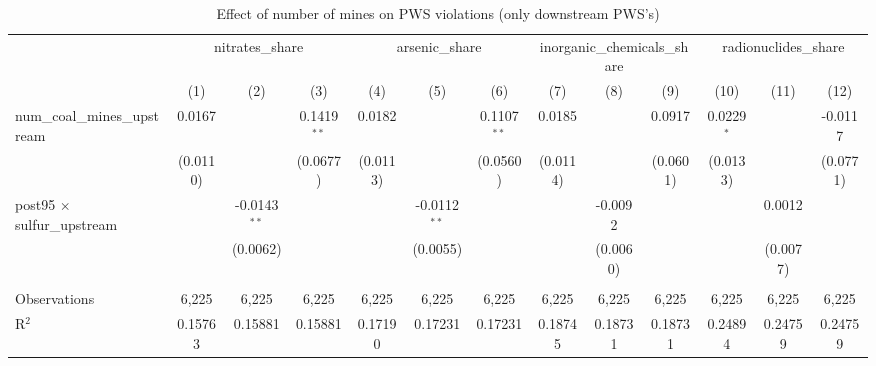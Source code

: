 
\begin{table}[htbp]
   \caption{\label{olsrf2sls_nummine_mine_vio_1985to2005dwnstrm} Effect of number of mines on PWS violations (only downstream PWS's)}
   \bigskip
   \centering
   \begin{adjustbox}{width = \textwidth, center}
      \begin{tabular}{lcccccccccccc}
         \toprule
          & \multicolumn{3}{c}{nitrates\_share} & \multicolumn{3}{c}{arsenic\_share} & \multicolumn{3}{c}{inorganic\_chemicals\_share} & \multicolumn{3}{c}{radionuclides\_share}\\
                                                           & (1)           & (2)            & (3)           & (4)           & (5)            & (6)           & (7)           & (8)           & (9)           & (10)          & (11)                 & (12)\\  
         \midrule 
         num\_coal\_mines\_upstream                        & 0.0167        &                & 0.1419$^{**}$ & 0.0182        &                & 0.1107$^{**}$ & 0.0185        &               & 0.0917        & 0.0229$^{*}$  &                      & -0.0117\\   
                                                           & (0.0110)      &                & (0.0677)      & (0.0113)      &                & (0.0560)      & (0.0114)      &               & (0.0601)      & (0.0133)      &                      & (0.0771)\\   
         post95 $\times$ sulfur\_upstream                  &               & -0.0143$^{**}$ &               &               & -0.0112$^{**}$ &               &               & -0.0092       &               &               & 0.0012               &   \\   
                                                           &               & (0.0062)       &               &               & (0.0055)       &               &               & (0.0060)      &               &               & (0.0077)             &   \\   
          \\
         Observations                                      & 6,225         & 6,225          & 6,225         & 6,225         & 6,225          & 6,225         & 6,225         & 6,225         & 6,225         & 6,225         & 6,225                & 6,225\\  
         R$^2$                                             & 0.15763       & 0.15881        & 0.15881       & 0.17190       & 0.17231        & 0.17231       & 0.18745       & 0.18731       & 0.18731       & 0.24894       & 0.24759              & 0.24759\\  

\end{tabular}
\end{adjustbox}
\end{table}
